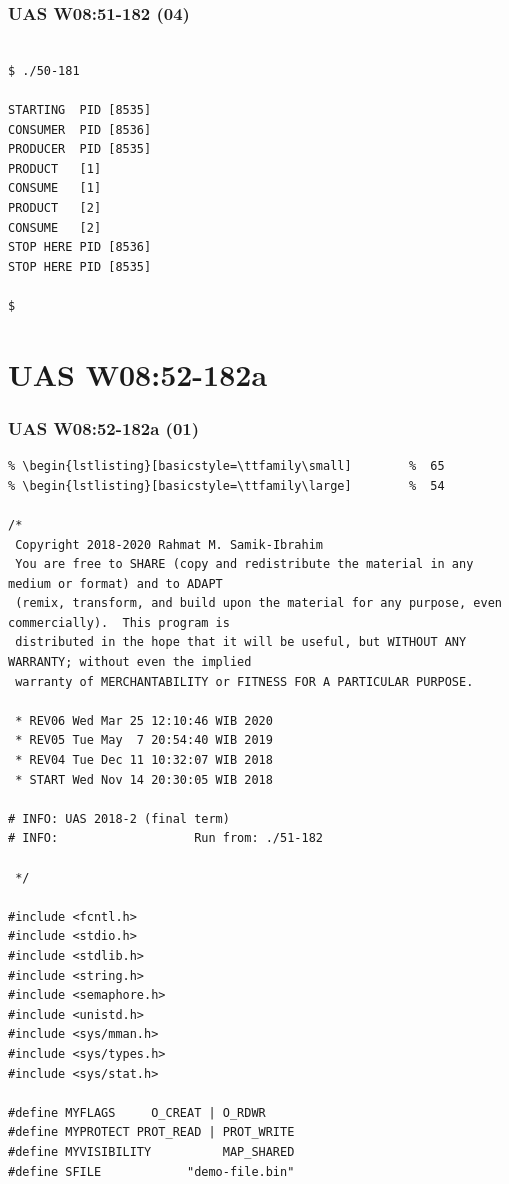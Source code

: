 \documentclass[aspectratio=169, xcolor=table, notheorems, hyperref={pdfpagelabels=false}]{beamer}
\begin{document}
\begin{frame}[fragile]
\frametitle{UAS W08:51-182 (04)}
\begin{lstlisting}[basicstyle=\ttfamily\large]        %  54

$ ./50-181 

STARTING  PID [8535]
CONSUMER  PID [8536]
PRODUCER  PID [8535]
PRODUCT   [1]
CONSUME   [1]
PRODUCT   [2]
CONSUME   [2]
STOP HERE PID [8536]
STOP HERE PID [8535]

$ 

\end{lstlisting}
\end{frame}

\section{UAS W08:52-182a}
\begin{frame}[fragile]
\frametitle{UAS W08:52-182a (01)}
\begin{lstlisting}[basicstyle=\ttfamily\tiny]         % 108
% \begin{lstlisting}[basicstyle=\ttfamily\footnotesize] %  72
% \begin{lstlisting}[basicstyle=\ttfamily\small]        %  65
% \begin{lstlisting}[basicstyle=\ttfamily\large]        %  54

/*
 Copyright 2018-2020 Rahmat M. Samik-Ibrahim
 You are free to SHARE (copy and redistribute the material in any medium or format) and to ADAPT 
 (remix, transform, and build upon the material for any purpose, even commercially).  This program is
 distributed in the hope that it will be useful, but WITHOUT ANY WARRANTY; without even the implied 
 warranty of MERCHANTABILITY or FITNESS FOR A PARTICULAR PURPOSE.

 * REV06 Wed Mar 25 12:10:46 WIB 2020
 * REV05 Tue May  7 20:54:40 WIB 2019
 * REV04 Tue Dec 11 10:32:07 WIB 2018
 * START Wed Nov 14 20:30:05 WIB 2018

# INFO: UAS 2018-2 (final term)
# INFO:                   Run from: ./51-182 

 */

#include <fcntl.h>
#include <stdio.h>
#include <stdlib.h>
#include <string.h>
#include <semaphore.h>
#include <unistd.h>
#include <sys/mman.h>
#include <sys/types.h>
#include <sys/stat.h>

#define MYFLAGS     O_CREAT | O_RDWR
#define MYPROTECT PROT_READ | PROT_WRITE
#define MYVISIBILITY          MAP_SHARED
#define SFILE            "demo-file.bin"

\end{lstlisting}
\end{frame}
\end{document}
